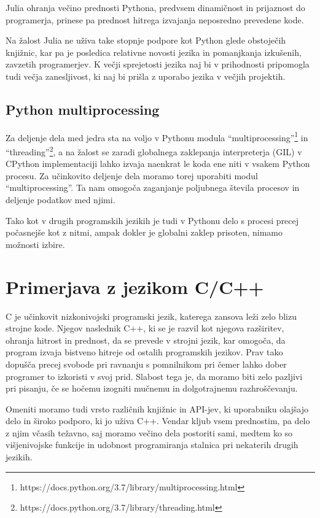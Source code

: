 \documentclass[journal,a4paper,twoside]{sty/IEEEtran}
\begin{document}
Julia ohranja večino prednosti Pythona, predvsem dinamičnost in prijaznost do programerja, prinese pa prednost hitrega izvajanja neposredno prevedene
	kode.

Na žalost Julia ne uživa take stopnje podpore kot Python glede obstoječih knjižnic, kar pa je posledica relativne novosti jezika in pomanjkanja izkušenih,
	zavzetih programerjev.
K večji sprejetosti jezika naj bi v prihodnosti pripomogla tudi večja zanesljivost, ki naj bi prišla z uporabo jezika v večjih projektih.

\subsection{Python multiprocessing}

Za deljenje dela med jedra sta na voljo v Pythonu modula “multiprocessing”\footnote{https://docs.python.org/3.7/library/multiprocessing.html} in
	“threading”\footnote{https://docs.python.org/3.7/library/threading.html}, a na žalost se zaradi globalnega zaklepanja interpreterja
	(GIL)\cite{python-gil} v CPython implementaciji lahko izvaja naenkrat le koda ene niti v vsakem Python procesu.
Za učinkovito deljenje dela moramo torej uporabiti modul “multiprocessing”.
Ta nam omogoča zaganjanje poljubnega števila procesov in deljenje podatkov med njimi.

Tako kot v drugih programskih jezikih je tudi v Pythonu delo s procesi precej počasnejše kot z nitmi, ampak dokler je globalni zaklep prisoten, nimamo
	možnosti izbire.

\section{Primerjava z jezikom C/C++}

C je učinkovit nizkonivojski programski jezik, katerega zansova leži zelo blizu strojne kode. 
Njegov naslednik C++, ki se je razvil kot njegova razširitev, ohranja hitrost in prednost, da se prevede v strojni jezik, kar omogoča, da program izvaja
	bistveno hitreje od ostalih programskih jezikov.
Prav tako dopušča precej svobode pri ravnanju s pomnilnikom pri čemer lahko dober programer to izkoristi v svoj prid.
Slabost tega je, da moramo biti zelo pazljivi pri pisanju, če se hočemu izogniti mučnemu in dolgotrajnemu razhroščevanju. 

Omeniti moramo tudi vrsto različnih knjižnic in API-jev, ki uporabniku olajšajo delo in široko podporo, ki jo uživa C++.
Vendar kljub vsem prednostim, pa delo z njim včasih težavno, saj moramo večino dela postoriti sami, medtem ko so višjenivojske funkcije in udobnost
	programiranja stalnica pri nekaterih drugih jezikih. 
\end{document}
